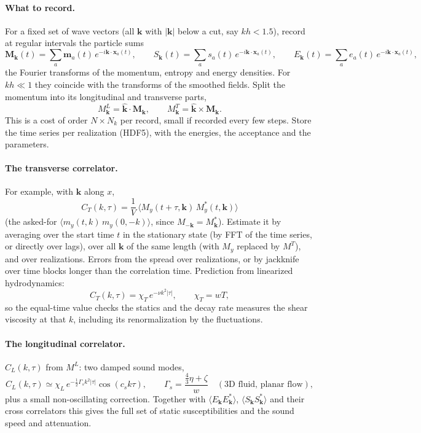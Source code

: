 \documentclass[11pt,aps,preprint,nofootinbib,superscriptaddress,tightenlines]{revtex4-2}
\def\st{\begin{equation}}
\def\stp{\end{equation}}
\newcommand{\avg}[1]{\langle #1\rangle}
\let\oldparagraph\paragraph
\renewcommand{\paragraph}{\par\bigskip\oldparagraph}
\begin{document}
\paragraph{What to record.}  For a fixed set of wave vectors (all $\bm k$ with
$|\bm k|$ below a cut, say $kh<1.5$), record at regular intervals the particle sums
\st
\bm M_{\bm k}(t)=\sum_a\bm m_a(t)\,e^{-i\bm k\cdot\bm x_a(t)},\qquad
S_{\bm k}(t)=\sum_as_a(t)\,e^{-i\bm k\cdot\bm x_a(t)},\qquad
E_{\bm k}(t)=\sum_ae_a(t)\,e^{-i\bm k\cdot\bm x_a(t)} ,
\stp
the Fourier transforms of the momentum, entropy and energy densities.  For
$kh\ll1$ they coincide with the transforms of the smoothed fields.  Split the
momentum into its longitudinal and transverse parts,
\st
M^L_{\bm k}=\hat{\bm k}\cdot\bm M_{\bm k},\qquad M^T_{\bm k}=\hat{\bm k}\times\bm M_{\bm k} .
\stp
This is a cost of order $N\times N_k$ per record, small if recorded every few
steps.  Store the time series per realization (HDF5), with the energies, the
acceptance and the parameters.

\paragraph{The transverse correlator.}  For example, with $\bm k$ along $x$,
\st
C_T(k,\tau)=\frac{1}{V}\,\avg{M_y(t+\tau,\bm k)\,M_y^*(t,\bm k)}
\stp
(the asked-for $\avg{m_y(t,k)\,m_y(0,-k)}$, since $M_{-\bm k}=M_{\bm k}^*$).  Estimate it
by averaging over the start time $t$ in the stationary state (by FFT of the
time series, or directly over lags), over all $\bm k$ of the same length (with
$M_y$ replaced by $M^T$), and over realizations.  Errors from the spread over
realizations, or by jackknife over time blocks longer than the correlation
time.  Prediction from linearized hydrodynamics:
\st
C_T(k,\tau)=\chi_T\,e^{-\nu k^2|\tau|},\qquad \chi_T=wT ,
\stp
so the equal-time value checks the statics and the decay rate measures the
shear viscosity at that $k$, including its renormalization by the
fluctuations.

\paragraph{The longitudinal correlator.}  $C_L(k,\tau)$ from $M^L$: two damped sound
modes,
\st
C_L(k,\tau)\simeq\chi_L\,e^{-\frac12\Gamma_sk^2|\tau|}\cos(c_sk\tau),\qquad
\Gamma_s=\frac{\tfrac43\eta+\zeta}{w}\quad(\text{3D fluid, planar flow}),
\stp
plus a small non-oscillating correction.  Together with $\avg{E_{\bm k}E_{\bm k}^*}$,
$\avg{S_{\bm k}S_{\bm k}^*}$ and their cross correlators this gives the full set of
static susceptibilities and the sound speed and attenuation.
\end{document}
